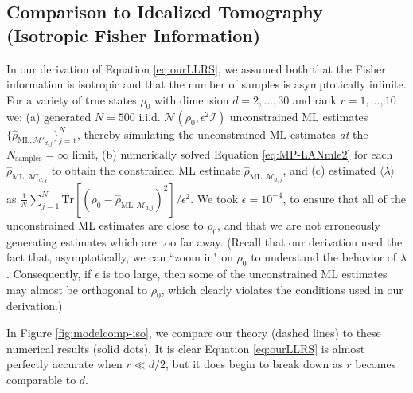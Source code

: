 \documentclass[aps,pra, twocolumn]{revtex4-1}
\newcommand{\M}{\mathcal{M}}
\newcommand{\rhohat}{\hat{\rho}}
\newcommand{\rhoML}[1]{\rhohat_{\scriptscriptstyle{\mathrm{ML},#1}}}
\begin{document}
\subsection{Comparison to Idealized Tomography (Isotropic Fisher Information)}
\label{sec:theorycomp1}

In our derivation of Equation \eqref{eq:ourLLRS}, we assumed both that the Fisher information is isotropic and that the number of samples is asymptotically infinite. For a variety of true states $\rho_{0}$ with dimension  $d=2,\ldots,30$ and rank $r=1,\ldots,10$ we: (a) generated $N=500$ i.i.d. $\mathcal{N}(\rho_{0}, \epsilon^{2}\mathcal{I})$ unconstrained ML estimates $\{\rhoML{\M'_{d, j}}\}_{j=1}^{N}$, thereby simulating the unconstrained ML estimates \emph{at} the $N_{\mathrm{samples}} = \infty$ limit, (b) numerically solved Equation \eqref{eq:MP-LANmle2} for each $\rhoML{\M'_{d, j}}$ to obtain the constrained ML estimate $\rhoML{\M_{d, j}}$, and (c) estimated $\langle \lambda \rangle$ as $\frac{1}{N}\sum_{j=1}^{N}\mathrm{Tr}[(\rho_{0} - \rhoML{\M_{d,j}})^{2}]/\epsilon^{2}$. We took $\epsilon = 10^{-4}$, to ensure that all of the unconstrained ML estimates are close to $\rho_{0}$, and that we are not erroneously generating estimates which are too far away. (Recall that our derivation used the fact that, asymptotically, we can ``zoom in" on $\rho_{0}$ to understand the behavior of $\lambda$. Consequently, if $\epsilon$ is too large, then some of the unconstrained ML estimates may almost be orthogonal to $\rho_{0}$, which clearly violates the conditions used in our derivation.)

In Figure \ref{fig:modelcomp-iso}, we compare our theory (dashed lines) to these numerical results (solid dots).  It is clear Equation \eqref{eq:ourLLRS} is almost perfectly accurate when $r \ll d/2$, but it does begin to break down as $r$ becomes comparable to $d$.
\end{document}

